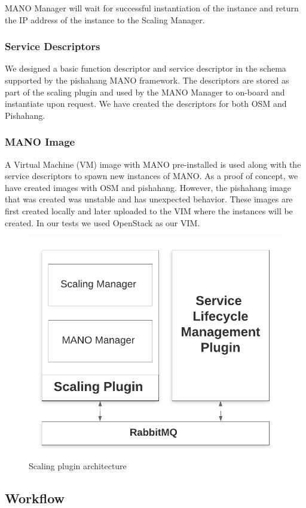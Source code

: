 MANO Manager will wait for successful instantiation of the instance and return the IP address of the instance to the Scaling Manager.

\subsubsection*{Service Descriptors}

We designed a basic function descriptor and service descriptor in the schema supported by the pishahang MANO framework. The descriptors are stored as part of the scaling plugin and used by the MANO Manager to on-board and instantiate upon request. We have created the descriptors for both OSM and Pishahang.

\subsubsection*{MANO Image}

A Virtual Machine (VM) image with MANO pre-installed is used along with the service descriptors to spawn new instances of MANO. As a proof of concept, we have created images with OSM and pishahang. However, the pishahang image that was created was unstable and has unexpected behavior. These images are first created locally and later uploaded to the VIM where the instances will be created. In our tests we used OpenStack as our VIM.

\begin{figure}[h]
	\centering
	\includegraphics[width=0.7\linewidth]{figures/scalingarch}
	\caption{Scaling plugin architecture}
	\label{fig:scalingarch}
\end{figure}


\subsection{Workflow}

